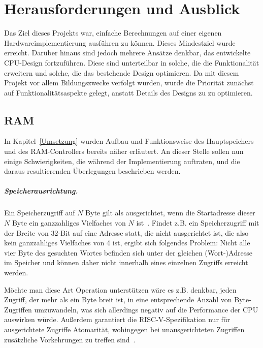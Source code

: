 \chapter{Herausforderungen und Ausblick} %
\label{Probleme} %

Das Ziel dieses Projekts war, einfache Berechnungen auf einer eigenen Hardwareimplementierung ausführen zu können. Dieses Mindestziel wurde erreicht. Darüber hinaus sind jedoch mehrere Ansätze denkbar, das entwickelte CPU-Design fortzuführen. Diese sind unterteilbar in solche, die die Funktionalität erweitern und solche, die das bestehende Design optimieren. Da mit diesem Projekt vor allem Bildungszwecke verfolgt wurden, wurde die Priorität zunächst auf Funktionalitätsaspekte gelegt, anstatt Details des Designs zu zu optimieren.
\section{RAM}

In Kapitel~\ref{Umsetzung} wurden Aufbau und Funktionsweise des Hauptspeichers und des RAM-Controllers bereits näher erläutert.
An dieser Stelle sollen nun einige Schwierigkeiten, die während der Implementierung auftraten, und die daraus resultierenden Überlegungen beschrieben werden.

\paragraph{Speicherausrichtung.} 
Ein Speicherzugriff auf $N$ Byte gilt als ausgerichtet, wenn die Startadresse dieser $N$ Byte ein ganzzahliges Vielfaches von $N$ ist~\cite[S. 96/97]{Hennessy}.
Findet z.B. ein Speicherzugriff mit der Breite von 32-Bit auf eine Adresse statt, die nicht ausgerichtet ist, die also kein ganzzahliges Vielfaches von 4 ist, ergibt sich folgendes Problem:
Nicht alle vier Byte des gesuchten Wortes befinden sich unter der gleichen (Wort-)Adresse im Speicher und können daher nicht innerhalb eines einzelnen Zugriffs erreicht werden.

Möchte man diese Art Operation unterstützen wäre es z.B. denkbar, jeden Zugriff, der mehr als ein Byte breit ist, in eine entsprechende Anzahl von Byte-Zugriffen umzuwandeln, was sich allerdings negativ auf die Performance der CPU auswirken würde.
Außerdem garantiert die RISC-V-Spezifikation nur für ausgerichtete Zugriffe Atomarität, wohingegen bei unausgerichteten Zugriffen zusätzliche Vorkehrungen zu treffen sind~\cite[S. 18]{RISC}.

